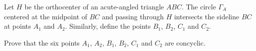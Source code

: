 Let $ H$ be the orthocenter of an acute-angled triangle $ ABC$. The circle $ \Gamma_{A}$ centered at the midpoint of $ BC$ and passing through $ H$ intersects the sideline $ BC$ at points  $ A_{1}$ and $ A_{2}$. Similarly, define the points $ B_{1}$,  $ B_{2}$,  $ C_{1}$ and $ C_{2}$.

Prove that the six points $ A_{1}$,  $ A_{2}$,  $ B_{1}$,  $ B_{2}$,  $ C_{1}$ and $ C_{2}$ are concyclic.